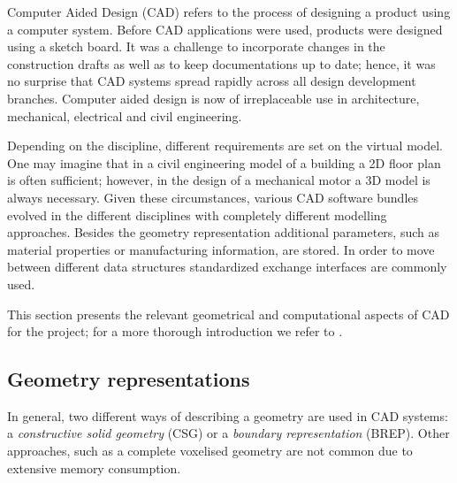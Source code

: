 Computer Aided Design (CAD) refers to the process of designing a product using a computer system. Before CAD applications were used, products were designed using a sketch board. It was a challenge to incorporate changes in the construction drafts as well as to keep documentations up to date; hence, it was no surprise that CAD systems spread rapidly across all design development branches. Computer aided design is now of irreplaceable use in architecture, mechanical, electrical and civil engineering.

Depending on the discipline, different requirements are set on the virtual model. One may imagine that in a civil engineering model of a building a 2D floor plan is often sufficient; however, in the design of a mechanical motor a 3D model is always necessary. Given these circumstances, various CAD software bundles evolved in the different disciplines with completely different modelling approaches. Besides the geometry representation additional parameters, such as material properties or manufacturing information, are stored. In order to move between different data structures standardized exchange interfaces are commonly used. 

This section presents the relevant geometrical and computational aspects of CAD for the project; for a more thorough introduction we refer to \cite{sarcarCAD}.

\subsection{Geometry representations}
In general, two different ways of describing a geometry are used in CAD systems: a \emph{constructive solid geometry} (CSG) or a \emph{boundary representation} (BREP). Other approaches, such as a complete voxelised geometry are not common due to extensive memory consumption.
